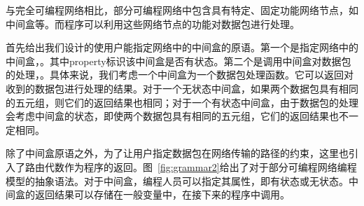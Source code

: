 与完全可编程网络相比，部分可编程网络中包含具有特定、固定功能网络节点，如中间盒等。而程序可以利用这些网络节点的功能对数据包进行处理。

首先给出我们设计的使用户能指定网络中的中间盒的原语。第一个是指定网络中的中间盒，。其中property标识该中间盒是否有状态。第二个是调用中间盒对数据包的处理，。具体来说，我们考虑一个中间盒为一个数据包处理函数。它可以返回对收到的数据包进行处理的结果。对于一个无状态中间盒，如果两个数据包具有相同的五元组，则它们的返回结果也相同；对于一个有状态中间盒，由于数据包的处理会考虑中间盒的状态，即使两个数据包具有相同的五元组，它们的返回结果也不一定相同。

除了中间盒原语之外，为了让用户指定数据包在网络传输的路径的约束，这里也引入了路由代数作为程序的返回。图~\ref{fig:grammar2}给出了对于部分可编程网络编程模型的抽象语法。对于中间盒，编程人员可以指定其属性，即有状态或无状态。中间盒的返回结果可以存储在一般变量中，在接下来的程序中调用。

